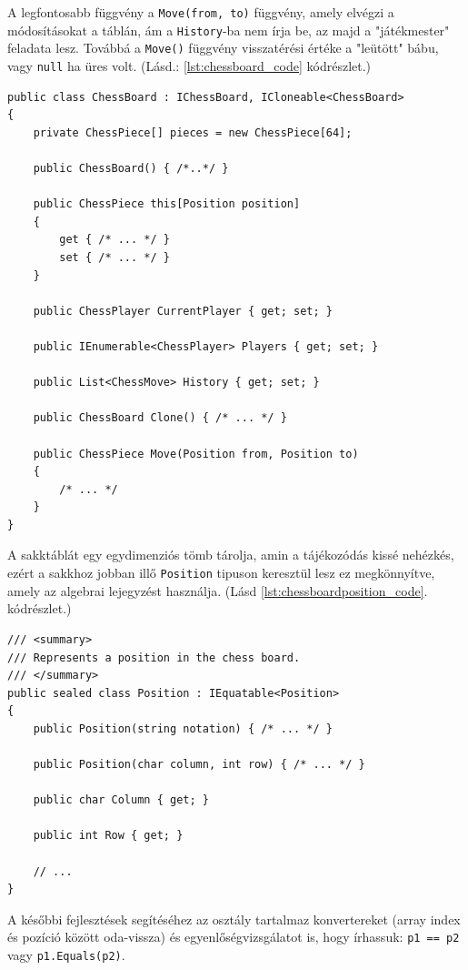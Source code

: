 \documentclass[twoside, a4paper, 12pt]{article}
\begin{document}
A legfontosabb függvény a \texttt{Move(from, to)} függvény, amely elvégzi a módosításokat a táblán, ám a \texttt{History}-ba nem írja be, az majd a "játékmester" feladata lesz. Továbbá a \texttt{Move()} függvény visszatérési értéke a "leütött" bábu, vagy \texttt{null} ha üres volt. (Lásd.: \ref{lst:chessboard_code} kódrészlet.)

\begin{lstlisting}[caption=Sakktábla implementáció vázlat, label=lst:chessboard_code]
public class ChessBoard : IChessBoard, ICloneable<ChessBoard>
{
	private ChessPiece[] pieces = new ChessPiece[64];

	public ChessBoard()	{ /*..*/ }

	public ChessPiece this[Position position]
	{
		get { /* ... */ }
		set { /* ... */ }
	}

	public ChessPlayer CurrentPlayer { get; set; }

	public IEnumerable<ChessPlayer> Players { get; set; }

	public List<ChessMove> History { get; set; }

	public ChessBoard Clone() { /* ... */ }

	public ChessPiece Move(Position from, Position to)
	{
		/* ... */
	}
}
\end{lstlisting}

A sakktáblát egy egydimenziós tömb tárolja, amin a tájékozódás kissé nehézkés, ezért a sakkhoz jobban illő \texttt{Position} tipuson keresztül lesz ez megkönnyítve, amely az algebrai lejegyzést használja. (Lásd \ref{lst:chessboardposition_code}. kódrészlet.)

\begin{lstlisting}[caption=Pozíciók a sakktáblán - Position osztály, label=lst:chessboardposition_code]
/// <summary>
/// Represents a position in the chess board.
/// </summary>
public sealed class Position : IEquatable<Position>
{
	public Position(string notation) { /* ... */ }
	
	public Position(char column, int row) { /* ... */ }
	
	public char Column { get; }
	
	public int Row { get; }
	
	// ...
}
\end{lstlisting}

A későbbi fejlesztések segítéséhez az osztály tartalmaz konvertereket (array index és pozíció között oda-vissza) és egyenlőségvizsgálatot is, hogy írhassuk: \texttt{p1 == p2} vagy \texttt{p1.Equals(p2)}.
\end{document}
